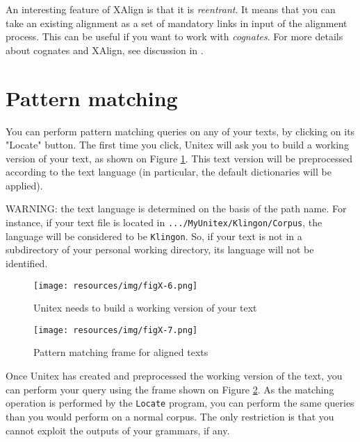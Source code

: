 \bigskip
\noindent An interesting feature of XAlign is that it is
\textit{reentrant}. It means that you can take an
existing alignment as a set of mandatory links in input of the alignment
process. This can be useful if you want to work with
\textit{cognates}. For more details about cognates and XAlign,
see discussion in \cite{IGML_PauDum08}.

\clearpage
\section{Pattern matching}
You can perform pattern matching queries on any of your texts, by clicking on
its "Locate" button. The first time you click, Unitex will ask you to build a
working version of your text, as shown on Figure \ref{fig-x-fig6}. This text
version will be preprocessed according to the text language (in particular,
the default dictionaries will be applied).

\bigskip
\noindent WARNING: the text language is determined on the basis of the path
name. For instance, if your text file is located in \verb+.../MyUnitex/Klingon/Corpus+, 
the language will be considered to be \verb+Klingon+. So, if your text is not
in a subdirectory of your personal working directory,
its language will not be identified.

\begin{figure}[!ht]
\begin{center}
\texttt{[image: resources/img/figX-6.png]}
\caption{Unitex needs to build a working version of your text\label{fig-x-fig6}}
\end{center}
\end{figure}
 
\begin{figure}[!ht]
\begin{center}
\texttt{[image: resources/img/figX-7.png]}
\caption{Pattern matching frame for aligned texts\label{fig-x-locate-frame}}
\end{center}
\end{figure}

\bigskip
\noindent Once Unitex has created and preprocessed the working version of the
text, you can perform your query using the frame shown on Figure
\ref{fig-x-locate-frame}. As the matching operation is performed by the
\verb+Locate+ program, you can perform the same queries
than you would perform on a normal corpus. The only restriction is that you
cannot exploit the outputs of your grammars, if any.

